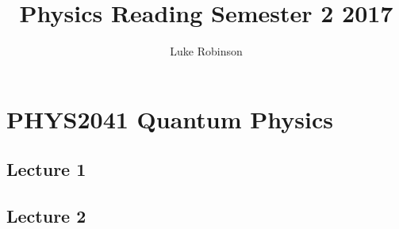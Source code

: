 \documentclass[8pt,a4paper,oneside]{article}
\title{Physics Reading Semester 2 2017}
\author{Luke Robinson}
\begin{document}
\maketitle
\tableofcontents
\section{PHYS2041 Quantum Physics}
\subsection{Lecture 1}

\subsection{Lecture 2}

\end{document}
